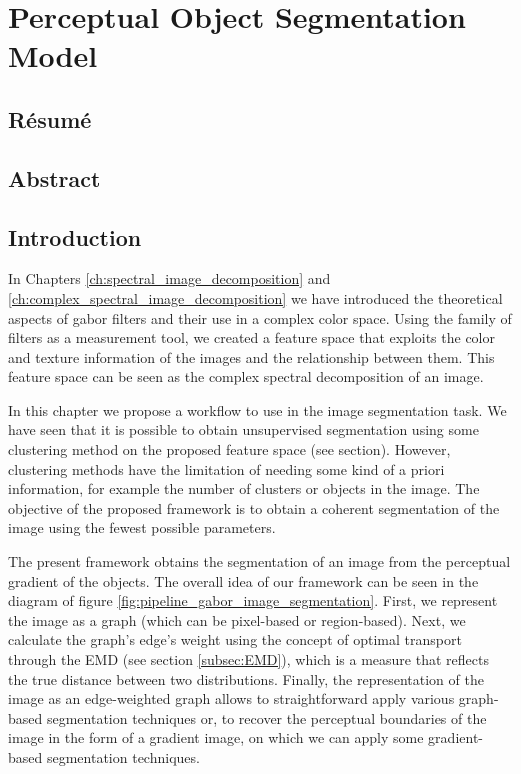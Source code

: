
\chapter{Perceptual Object Segmentation Model} \label{ch:perceptual_object_boundaries_detection}

\section*{Résumé}
\noindent 

\section*{Abstract}
\noindent 

\section{Introduction}
In Chapters \ref{ch:spectral_image_decomposition} and \ref{ch:complex_spectral_image_decomposition} we have introduced the theoretical aspects of gabor filters and their use in a complex color space. Using the family of filters as a measurement tool, we created a feature space that exploits the color and texture information of the images and the relationship between them. This feature space can be seen as the complex spectral decomposition of an image.

In this chapter we propose a workflow to use in the image segmentation task. We have seen that it is possible to obtain unsupervised segmentation using some clustering method on the proposed feature space (see section). However, clustering methods have the limitation of needing some kind of a priori information, for example the number of clusters or objects in the image. The objective of the proposed framework is to obtain a coherent segmentation of the image using the fewest possible parameters.

The present framework obtains the segmentation of an image from the perceptual gradient of the objects. The overall idea of our framework can be seen in the diagram of figure \ref{fig:pipeline_gabor_image_segmentation}. First, we represent the image as a graph (which can be pixel-based or region-based). Next, we calculate the graph's edge's weight using the concept of optimal transport through the EMD (see section \ref{subsec:EMD}), which is a measure that reflects the true distance between two distributions. Finally, the representation of the image as an edge-weighted graph allows to straightforward apply various graph-based segmentation techniques or, to recover the perceptual boundaries of the image in the form of a gradient image, on which we can apply some gradient-based segmentation techniques.


